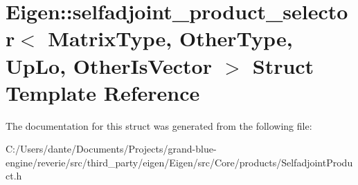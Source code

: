 \hypertarget{struct_eigen_1_1selfadjoint__product__selector}{}\section{Eigen\+::selfadjoint\+\_\+product\+\_\+selector$<$ Matrix\+Type, Other\+Type, Up\+Lo, Other\+Is\+Vector $>$ Struct Template Reference}
\label{struct_eigen_1_1selfadjoint__product__selector}


The documentation for this struct was generated from the following file\+:\begin{DoxyCompactItemize}
\item 
C\+:/\+Users/dante/\+Documents/\+Projects/grand-\/blue-\/engine/reverie/src/third\+\_\+party/eigen/\+Eigen/src/\+Core/products/Selfadjoint\+Product.\+h\end{DoxyCompactItemize}
